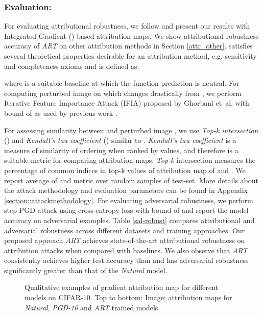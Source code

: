 \documentclass[runningheads]{llncs}
\def\etal{et~al.}
\begin{document}
\subsubsection{Evaluation:} For evaluating attributional robustness, we follow \cite{robust_attr_nips_sal} and present our results with Integrated Gradient ()-based attribution maps. We show attributional robustness accuracy of \textit{ART} on other attribution methods in Section \ref{attr_other}.  satisfies several theoretical properties desirable for an attribution method, e.g. sensitivity and completeness axioms and is defined as: 

where  is a suitable baseline at which the function prediction is neutral. 
For computing perturbed image  on which  changes drastically from , we perform Iterative Feature Importance Attack (IFIA) proposed by Ghorbani \etal \cite{aaai_sal} with  bound of  as used by previous work \cite{robust_attr_nips_sal}.

For assessing similarity between  and perturbed image , we use \textit{Top-k intersection} () and \textit{Kendall's tau coefficient} () similar to \cite{robust_attr_nips_sal}. \textit{Kendall's tau coefficient} is a measure of similarity of ordering when ranked by values, and therefore is a suitable metric for comparing attribution maps. \textit{Top-k} intersection measures the percentage of common indices in top-k values of attribution map of  and . We report average of  and  metric over random  samples of test-set. More details about the attack methodology and evaluation parameters can be found in Appendix \ref{section::attackmethodology}. For evaluating adversarial robustness, we perform  step PGD attack \cite{madrypgd} using cross-entropy loss with  bound of  and report the model accuracy on adversarial examples. Table \ref{sal-robust} compares attributional and adversarial robustness across different datasets and training approaches. Our proposed approach \textit{ART} achieves state-of-the-art attributional robustness on attribution attacks \cite{aaai_sal} when compared with baselines. We also observe that \textit{ART} consistently achieves higher test accuracy than \cite{madrypgd} and has adversarial robustness significantly greater than that of the \textit{Natural} model.

\begin{figure}[t]
\centering
{}
\caption{\footnotesize{Qualitative examples of gradient attribution map \cite{attr2013gradient} for different models on CIFAR-10. Top to bottom: Image; attribution maps for \textit{Natural}, \textit{PGD-10} and \textit{ART} trained models}}
\label{fig:quality}
\end{figure}
\end{document}
